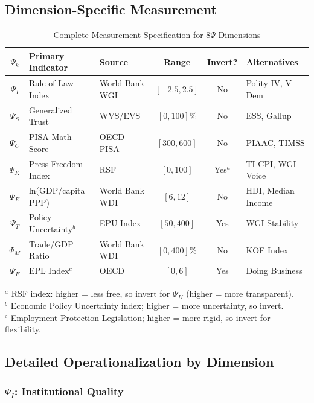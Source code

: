 \subsection{Dimension-Specific Measurement}

\begin{table}[htbp]
\centering
\caption{Complete Measurement Specification for 8$\Psi$-Dimensions}
\label{tab:V-measurement}
\small
\renewcommand{\arraystretch}{1.3}
\begin{tabular}{@{}cp{2.5cm}p{3cm}ccp{2cm}@{}}
\toprule
$\Psi_k$ & \textbf{Primary Indicator} & \textbf{Source} & \textbf{Range} & \textbf{Invert?} & \textbf{Alternatives} \\
\midrule
$\Psi_I$ & Rule of Law Index & World Bank WGI & $[-2.5, 2.5]$ & No & Polity IV, V-Dem \\
$\Psi_S$ & Generalized Trust & WVS/EVS & $[0, 100]\%$ & No & ESS, Gallup \\
$\Psi_C$ & PISA Math Score & OECD PISA & $[300, 600]$ & No & PIAAC, TIMSS \\
$\Psi_K$ & Press Freedom Index & RSF & $[0, 100]$ & Yes$^a$ & TI CPI, WGI Voice \\
$\Psi_E$ & ln(GDP/capita PPP) & World Bank WDI & $[6, 12]$ & No & HDI, Median Income \\
$\Psi_T$ & Policy Uncertainty$^b$ & EPU Index & $[50, 400]$ & Yes & WGI Stability \\
$\Psi_M$ & Trade/GDP Ratio & World Bank WDI & $[0, 400]\%$ & No & KOF Index \\
$\Psi_F$ & EPL Index$^c$ & OECD & $[0, 6]$ & Yes & Doing Business \\
\bottomrule
\end{tabular}

\vspace{0.5em}
\footnotesize
$^a$ RSF index: higher = less free, so invert for $\Psi_K$ (higher = more transparent). \\
$^b$ Economic Policy Uncertainty index; higher = more uncertainty, so invert. \\
$^c$ Employment Protection Legislation; higher = more rigid, so invert for flexibility.
\end{table}

\subsection{Detailed Operationalization by Dimension}

\subsubsection{$\Psi_I$: Institutional Quality}

